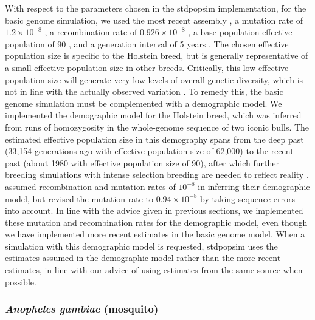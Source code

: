 \documentclass[hidelinks]{article}
\begin{document}
With respect to the parameters chosen in the stdpopsim implementation,
for the basic genome simulation, we used the most recent assembly
\citep{Rosen2020}, a mutation rate of \(1.2 \times 10^{-8}\) \citep{Harland2017},
a recombination rate of \(0.926 \times 10^{-8}\) \citep{Ma2015}, a base population
effective population of 90 \citep{MacLeod2013}, and a generation interval of 5
years \citep{MacLeod2013}. The chosen effective population size is specific
to the Holstein breed, but is generally representative of a small
effective population size in other breeds. Critically, this low
effective population size will generate very low levels of overall
genetic diversity, which is not in line with the actually observed
variation \citep[e.g.,][]{Rosen2020}. To remedy this, the basic genome
simulation must be complemented with a demographic model. We implemented
the \cite{MacLeod2013} demographic model for the Holstein breed, which was
inferred from runs of homozygosity in the whole-genome sequence of two
iconic bulls. The estimated effective population size in this demography
spans from the deep past (33,154 generations ago with effective population size
of 62,000) to the recent past (about 1980 with effective population size of 90),
after which further breeding simulations with intense selection breeding are
needed to reflect reality \citep[e.g.,][]{
MacLeod2014, Gaynor2020, Obsteter2021}. \cite{MacLeod2013} assumed
recombination and mutation rates of \(10^{-8}\) in inferring their
demographic model, but revised the mutation rate to \(0.94 \times 10^{-8}\) by
taking sequence errors into account. In line with the advice given in
previous sections, we implemented these mutation and recombination rates
for the \cite{MacLeod2013} demographic model, even though we have implemented
more recent estimates in the basic genome model. 
When a simulation with this demographic model is requested, stdpopsim uses the
estimates assumed in the demographic model rather than the more
recent estimates, in line with our advice of using estimates from the same
source when possible.

\hypertarget{ano-gambea}{%
	\subsubsection*{\texorpdfstring{\emph{Anopheles gambiae} (mosquito)}{Anopheles gambiae (mosquito)}}\label{bos-taurus}}
\end{document}
